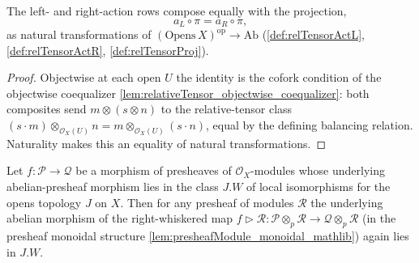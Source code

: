 \begin{lemma}
  \label{lem:snap_relTensorActL_proj_eq}
  The left- and right-action rows compose equally with the projection,
  \[
    a_L \circ \pi = a_R \circ \pi,
  \]
  as natural transformations of \((\mathrm{Opens}\,X)^{\mathrm{op}} \to
  \mathrm{Ab}\) (\cref{def:relTensorActL}, \cref{def:relTensorActR},
  \cref{def:relTensorProj}).
\end{lemma}

\begin{proof}
  \leanok
  Objectwise at each open \(U\) the identity is the cofork condition of the
  objectwise coequalizer \cref{lem:relativeTensor_objectwise_coequalizer}: both
  composites send \(m \otimes (s \otimes n)\) to the relative-tensor class
  \((s \cdot m) \otimes_{\mathcal{O}_X(U)} n = m \otimes_{\mathcal{O}_X(U)}
  (s \cdot n)\), equal by the defining balancing relation. Naturality makes this
  an equality of natural transformations.
\end{proof}

\begin{lemma}
  \label{lem:snap_ztensor_whisker_localIso}
  Let \(f : \mathcal{P} \to \mathcal{Q}\) be a morphism of presheaves of
  \(\mathcal{O}_X\)-modules whose underlying abelian-presheaf morphism lies in the
  class \(J.W\) of local isomorphisms for the opens topology \(J\) on \(X\). Then
  for any presheaf of modules \(\mathcal{R}\) the underlying abelian morphism of
  the right-whiskered map \(f \rhd \mathcal{R} : \mathcal{P} \otimes_p \mathcal{R}
  \to \mathcal{Q} \otimes_p \mathcal{R}\) (in the presheaf monoidal structure
  \cref{lem:presheafModule_monoidal_mathlib}) again lies in \(J.W\).
\end{lemma}

